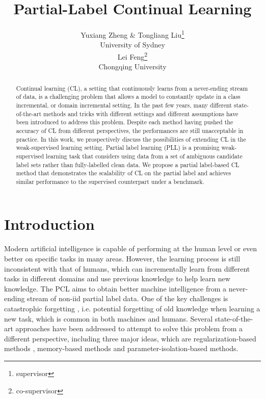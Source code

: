 \documentclass{article} %
\title{Partial-Label Continual Learning}
\author{Yuxiang Zheng \& Tongliang Liu\thanks{supervisor} \\
University of Sydney \\
\And
Lei Feng\thanks{co-supervisor} \\
Chongqing University
}
\begin{document}
\maketitle

\begin{abstract}
Continual learning (CL), a setting that continuously learns from a never-ending stream of data, is a challenging problem that allows a model to constantly update in a class incremental, or domain incremental setting.
In the past few years, many different state-of-the-art methods and tricks with different settings and different assumptions have been introduced to address this problem. Despite each method having pushed the accuracy of CL from different perspectives, the performances are still unacceptable in practice. 
In this work, we prospectively discuss the possibilities of extending CL in the weak-supervised learning setting. 
Partial label learning (PLL) is a promising weak-supervised learning task that considers using data from a set of ambiguous candidate label sets rather than fully-labelled clean data. 
We propose a partial label-based CL method that demonstrates the scalability of CL on the partial label and achieves similar performance to the supervised counterpart under a benchmark. 
\end{abstract}

\section{Introduction}
Modern artificial intelligence is capable of performing at the human level or even better on specific tasks in many areas.\citep{AlexKrizhevsky2012ImageNetCW}
However, the learning process is still inconsistent with that of humans, which can incrementally learn from different tasks in different domains and use previous knowledge to help learn new knowledge.
The PCL aims to obtain better machine intelligence from a never-ending stream of non-iid partial label data.
One of the key challenges is catastrophic forgetting \citep{IanGoodfellow2013AnEI}, i.e. potential forgetting of old knowledge when learning a new task, which is common in both machines and humans.
Several state-of-the-art approaches have been addressed to attempt to solve this problem from a different perspective, including three major ideas, which are regularization-based methods \citep{JamesKirkpatrick2016OvercomingCF, ZhizhongLi2016LearningWF}, memory-based methods\citep{SylvestreAlviseRebuffi2016iCaRLIC, ArslanChaudhry2019OnTE, MIR, AmeyaPrabhu2020GDumbAS} and parameter-isolation-based methods\citep{SoochanLee2020AND}.
\end{document}
